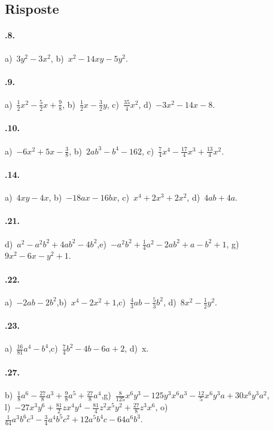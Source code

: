 \subsection{Risposte}
\paragraph{\thechapter.8.} a)~$3y^{2}-3x^{2}$, \quad b)~$x^{2}-14xy-5y^{2}$.
\paragraph{\thechapter.9.} a)~$\frac{1}{2}x^{2}-\frac{5}{2}x+\frac{9}{8}$, \quad b)~$\frac{1}{2}x-\frac{3}{2}y$, \quad c)~$\frac{35}{4}x^{2}$, \quad d)~$-3x^{2}-14x-8$.
\paragraph{\thechapter.10.} a)~$-6x^{2}+5x-\frac{3}{8}$, \quad b)~$2{ab}^{3}-b^{4}-162$, \quad c)~$\frac{7}{4}x^{4}-\frac{17}{4}x^{3}+\frac{13}{4}x^{2}$.
\paragraph{\thechapter.14.} a)~$4{xy}-4x$, \quad b)~$-18ax-16bx$, \quad c)~$x^{4}+2x^{3}+2x^{2}$, \quad d)~$4ab+4a$.
\paragraph{\thechapter.21.} d)~$a^{2}-a^{2}b^{2}+4{ab}^{2}-4b^{2}$,\quad e)~$-a^{2}b^{2}+\frac{1}{4}a^{2}-2{ab}^{2}+a-b^{2}+1$,\quad%
g)~$9x^{2}-6x-y^{2}+1$.
\paragraph{\thechapter.22.} a)~$-2{ab}-2b^{2}$,\quad b)~$x^{4}-2x^{2}+1$,\quad c)~$\frac{4}{3}{ab}-\frac{5}{3}b^{2}$, \quad d)~$8x^2-\frac{1}{2}y^2$.
\paragraph{\thechapter.23.} a)~$\frac{16}{81}a^{4}-b^{4}$,\quad c)~$\frac{7}{4}b^{2}-4b-6a+2$, \quad d)~x.
\paragraph{\thechapter.27.} b)~$\frac{1}{8}a^{6}-\frac{27}{8}a^{3}+\frac{9}{8}a^{5}+\frac{27}{8}a^{4}$,\quad g)~$\frac{8}{125}x^{6}y^{3}-125y^{3}x^{6}a^{3}-\frac{12}{5}x^{6}y^{3}a+30x^{6}y^{3}a^{2}$,\protect\\  l)~$-27x^{3}y^{6}+\frac{81}{2}zx^{4}y^{4}-\frac{81}{4}z^{2}x^{5}y^{2}+\frac{27}{8}z^{3}x^{6}$, \quad o)~$\frac{1}{64}a^{3}b^{6}c^{3}-\frac{3}{4}a^{4}b^{5}c^{2}+12a^{5}b^{4}c-{64}a^{6}b^{3}$.
